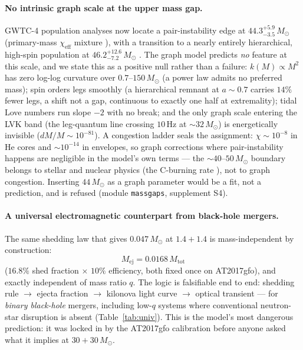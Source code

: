\documentclass[11pt]{article}
\begin{document}
\paragraph{No intrinsic graph scale at the upper mass gap.}
GWTC-4 population analyses now locate a pair-instability edge at
$44.3^{+5.9}_{-3.5}\,M_\odot$ (primary-mass $\chi_{\mathrm{eff}}$ mixture
\cite{PISN GWTC4}), with a transition to a nearly entirely hierarchical,
high-spin population at $46.2^{+12.6}_{-7.2}\,M_\odot$ \cite{HierGWTC4}.
The graph model predicts \emph{no} feature at this scale, and we state this
as a positive null rather than a failure: $k(M) \propto M^2$ has zero
log-log curvature over $0.7$--$150\,M_\odot$ (a power law admits no
preferred mass); spin orders legs smoothly (a hierarchical remnant at
$a \sim 0.7$ carries $14\%$ fewer legs, a shift not a gap, continuous to
exactly one half at extremality); tidal Love numbers run slope $-2$ with
no break; and the only graph scale entering the LVK band (the leg-quantum
line crossing $10$\,Hz at $\sim 32\,M_\odot$) is energetically invisible
($dM/M \sim 10^{-81}$). A congestion ladder seals the assignment:
$\chi \sim 10^{-8}$ in He cores and $\sim 10^{-14}$ in envelopes, so graph
corrections where pair-instability happens are negligible in the model's
own terms --- the $\sim 40$--$50\,M_\odot$ boundary belongs to stellar and
nuclear physics (the C-burning rate \cite{PISN GWTC4}), not to graph
congestion. Inserting $44\,M_\odot$ as a graph parameter would be a fit,
not a prediction, and is refused (module \texttt{massgaps}, supplement S4).

\paragraph{A universal electromagnetic counterpart from black-hole mergers.}
The same shedding law that gives $0.047\,M_\odot$ at $1.4+1.4$ is
mass-independent by construction:
\begin{equation}
\boxed{M_{\mathrm{ej}} = 0.0168\,M_{\mathrm{tot}}}
\label{eq:shed}
\end{equation}
($16.8\%$ shed fraction $\times$ $10\%$ efficiency, both fixed once on
AT2017gfo), and exactly independent of mass ratio $q$. The logic is
falsifiable end to end: shedding rule $\to$ ejecta fraction $\to$
kilonova light curve $\to$ optical transient --- for \emph{binary
black-hole} mergers, including low-$q$ systems where conventional
neutron-star disruption is absent (Table~\ref{tab:univ}). This is the
model's most dangerous prediction: it was locked in by the AT2017gfo
calibration before anyone asked what it implies at $30+30\,M_\odot$.
\end{document}
